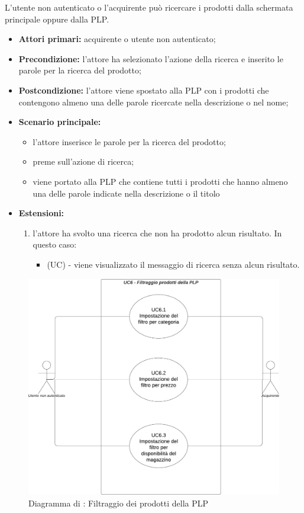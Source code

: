 L'utente non autenticato o l'acquirente può ricercare i prodotti dalla schermata principale oppure dalla PLP.
\begin{itemize}
    \item \textbf{Attori primari:} acquirente o utente non autenticato;
    \item \textbf{Precondizione:} l'attore ha selezionato l'azione della ricerca e inserito le parole per la ricerca del prodotto;
    \item \textbf{Postcondizione:} l'attore viene spostato alla PLP con i prodotti che contengono almeno una delle parole ricercate nella descrizione o nel nome;
    \item \textbf{Scenario principale:} 
    \begin{itemize}
        \item l'attore inserisce le parole per la ricerca del prodotto;
        \item preme sull'azione di ricerca;
        \item viene portato alla PLP che contiene tutti i prodotti che hanno almeno una delle parole indicate nella descrizione o il titolo
    \end{itemize}
    \item \textbf{Estensioni:}
    \begin{enumerate}
        \item l'attore ha svolto una ricerca che non ha prodotto alcun risultato. In questo caso:
        \begin{itemize}
            \item (UC) - viene visualizzato il messaggio di ricerca senza alcun risultato.
        \end{itemize}
    \end{enumerate}
\end{itemize}

\begin{figure}[H]
    \centering
    \includegraphics[scale=0.5]{Immagini/DiagrammiUC/UC6FiltraggioProdottiDellaPLP.png}
    \caption{Diagramma di \actualUC: Filtraggio dei prodotti della PLP} 
\end{figure}

